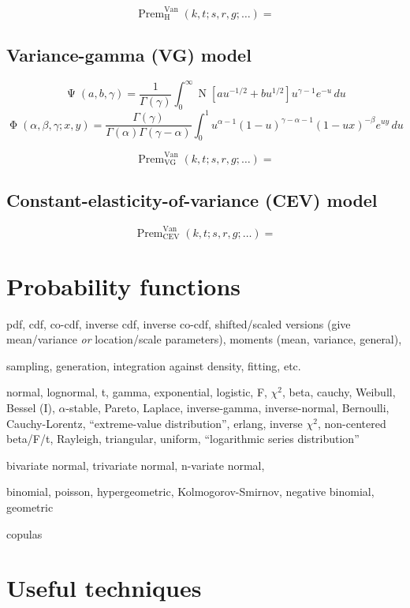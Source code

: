 \documentclass[10pt,dvipdfmx,letterpaper,twoside]{article}
\let\O=\operatorname
\let\al=\alpha
\let\gam=\gamma
\let\Gam=\Gamma
\begin{document}
\[ \O{Prem}^\text{Van}_\text{H}(k, t; s, r, g; \dots) = \]

\subsection{Variance-gamma (VG) model}

\[ \O{\Psi}(a, b, \gam) = \frac{1}{\Gam(\gam)}\int_0^\infty \O{N}[ a u^{-1/2} + b u^{1/2} ] u^{\gam-1} e^{-u} \,du \]
\[ \O{\Phi}(\al, \beta, \gam; x, y) = \frac{\Gam(\gam)}{\Gam(\al)\Gam(\gam-\al)} \int_0^1 u^{\al-1} (1-u)^{\gam-\al-1} (1-ux)^{-\beta} e^{uy} \,du \]

\[ \O{Prem}^\text{Van}_\text{VG}(k, t; s, r, g; \dots) = \]

\subsection{Constant-elasticity-of-variance (CEV) model}
\[ \O{Prem}^\text{Van}_\text{CEV}(k, t; s, r, g; \dots) = \]


\section{Probability functions}
pdf, cdf, co-cdf, inverse cdf, inverse co-cdf, shifted/scaled versions (give mean/variance {\em or} location/scale parameters), moments (mean, variance, general),

sampling, generation, integration against density, fitting, etc.

normal, lognormal, t, gamma, exponential, logistic, F, $\chi^2$, beta, cauchy, Weibull, Bessel (I),
$\al$-stable, Pareto, Laplace, inverse-gamma, inverse-normal, Bernoulli, Cauchy-Lorentz, ``extreme-value distribution'',
erlang, inverse $\chi^2$, non-centered beta/F/t, Rayleigh, triangular, uniform, ``logarithmic series distribution''


bivariate normal, trivariate normal, n-variate normal,

binomial, poisson, hypergeometric, Kolmogorov-Smirnov, negative binomial, geometric

copulas

\section{Useful techniques}
\end{document}
